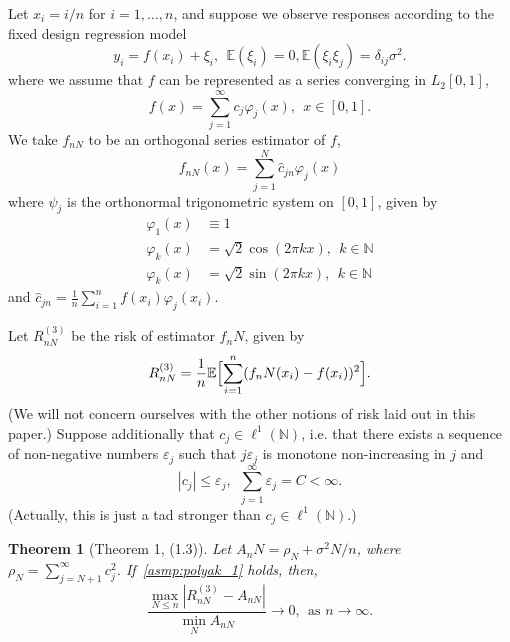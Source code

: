 \documentclass{article}
\newcommand{\abs}[1]{\left \lvert #1 \right \rvert}
\newcommand{\1}{\mathbf{1}}
\newcommand{\Ebb}{\mathbb{E}}
\newcommand{\wh}[1]{\widehat{#1}}
\theoremstyle{alden}
\theoremstyle{aldenthm}
\newtheorem{theorem}{Theorem}
\theoremstyle{definition}
\theoremstyle{remark}
\begin{document}
Let $x_i = i/n$ for $i = 1,\ldots,n$, and suppose we observe responses according to the fixed design regression model
\begin{equation*}
y_i = f(x_i) + \xi_i,~~ \Ebb(\xi_i) = 0, \Ebb(\xi_i\xi_j) = \delta_{ij} \sigma^2.
\end{equation*}
where we assume that $f$ can be represented as a series converging in $L_2[0,1]$,
\begin{equation}
f(x) = \sum_{j = 1}^{\infty} c_j \varphi_j(x),~~ x \in [0,1].
\end{equation}
We take $f_{nN}$ to be an orthogonal series estimator of $f$,
\begin{equation*}
f_{nN}(x) = \sum_{j = 1}^{N} \wh{c}_{jn} \varphi_j(x)
\end{equation*}
where $\psi_j$ is the orthonormal trigonometric system on $[0,1]$, given by
\begin{align*}
\varphi_1(x) & \equiv 1 \\
\varphi_k(x) & = \sqrt{2}\cos(2\pi k x),~~k \in \mathbb{N} \\
\varphi_k(x) & = \sqrt{2}\sin(2\pi k x),~~k \in \mathbb{N}
\end{align*}
and $\wh{c}_{jn} = \frac{1}{n}\sum_{i = 1}^{n} f(x_i) \varphi_j(x_i)$. 

Let $R_{nN}^{(3)}$ be the risk of estimator $f_nN$, given by
\begin{equation*}
R_{nN}^{(3)} = \frac{1}{n} \mathbb{E}\Bigl[\sum_{i = 1}^{n} (f_nN(x_i) - f(x_i))^2\Bigr].
\end{equation*}
(We will not concern ourselves with the other notions of risk laid out in this paper.)
Suppose additionally that $c_j \in \ell^1(\mathbb{N})$, i.e. that there exists a sequence of non-negative numbers $\varepsilon_j$ such that $j\varepsilon_j$ is monotone non-increasing in $j$ and 
\begin{equation}
\label{asmp:polyak_1}
\abs{c_j} \leq \varepsilon_j,~~ \sum_{j = 1}^{\infty} \varepsilon_j = C < \infty.
\end{equation}
(Actually, this is just a tad stronger than $c_j \in \ell^1(\mathbb{N})$.)
\begin{theorem}[Theorem 1, (1.3)]
	Let $A_nN = \rho_N + \sigma^2 N / n$, where $\rho_N = \sum_{j = N + 1}^{\infty} c_j^2$. If~\eqref{asmp:polyak_1} holds, then,
	\begin{equation*}
	\frac{\max_{N \leq n}\abs{R_{nN}^{(3)} - A_{nN}}}{\min_{N}A_{nN}} \to 0,~~ \textrm{as $n \to \infty$.}
	\end{equation*}
\end{theorem}
\end{document}
